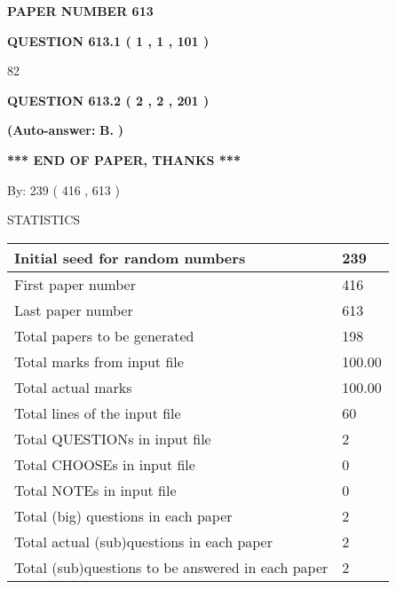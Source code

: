 \documentclass[12pt]{article}
\begin{document}
   
\newpage 
\setcounter{page}{ 
   613001 } 
   
   
 {\textbf{ \Large{ PAPER NUMBER  613  }}}
   
   
   
   
  
  
{\textbf{\large{QUESTION
613.1 
 ( 1 , 1 , 101 )
}}}

82
  
  
{\textbf{\large{QUESTION
613.2 
 ( 2 , 2 , 201 )
}}}
 
 
{\textbf{(Auto-answer:}}
{\textbf{\large{
B.}}}
{\textbf{)}}
 
 
   
   
   
   
\vspace{1.0in} 
{\textbf{\large{ *** END OF PAPER, THANKS *** }}} 
   
   
\hspace{1.0in} By: 
 239 ( 416 ,  613 )
   
   
   
\vspace{0.2in}
\vspace{0.2in}
   
   
 \newpage
\setcounter{page}{1} 
   
   
 {\LARGE{STATISTICS}}
   
\vspace{0.2in}
   
 \begin{tabular}{|l|l|}
 \hline
 Initial seed for random numbers & 239  \\
\hline
 First paper number & 416  \\
\hline
 Last  paper number & 613  \\
\hline
 Total papers to be generated & 198  \\
\hline
Total marks from input file & 100.00 \\
\hline
Total actual marks & 100.00 \\
\hline
 Total lines of the input file & 60  \\
 \hline
 Total QUESTIONs in input file & 2  \\
\hline
 Total CHOOSEs in input file & 0  \\
\hline
 Total NOTEs in input file & 0  \\
\hline
 Total (big) questions in each paper & 2  \\
\hline
 Total actual (sub)questions in each paper & 2  \\
\hline
 Total (sub)questions to be answered in each paper & 2  \\
\hline
 \end{tabular}
   
\end{document}
